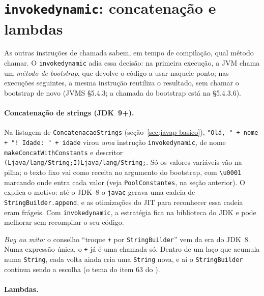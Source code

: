 \section{\texttt{invokedynamic}: concatenação e lambdas}
\label{sec:invokedynamic}

As outras instruções de chamada sabem, em tempo de compilação, qual
método chamar. O \texttt{invokedynamic} adia essa decisão: na primeira
execução, a JVM chama um \emph{método de bootstrap}, que devolve o código
a usar naquele ponto; nas execuções seguintes, a mesma instrução reutiliza
o resultado, sem chamar o bootstrap de novo (JVMS §5.4.3; a chamada do
bootstrap está na §5.4.3.6).

\paragraph{Concatenação de strings (JDK~9+).}
Na listagem de \texttt{ConcatenacaoStrings}
(seção~\ref{sec:javap-basico}), \texttt{"Olá, " + nome + "! Idade: " +
idade} virou \emph{uma} instrução \texttt{invokedynamic}, de nome
\texttt{makeConcatWithConstants} e descritor
\nolinkurl{(Ljava/lang/String;I)Ljava/lang/String;}. Só os
valores variáveis vão na pilha; o texto fixo vai como receita no
argumento do bootstrap, com \texttt{\textbackslash u0001} marcando onde
entra cada valor (veja \texttt{PoolConstantes}, na seção anterior). O
 explica o motivo: até o JDK~8 o \texttt{javac}
gerava uma cadeia de \texttt{StringBuilder.append}, e as otimizações do
JIT para reconhecer essa cadeia eram frágeis. Com \texttt{invokedynamic},
a estratégia fica na biblioteca do JDK e pode melhorar sem recompilar o
seu código.

\emph{Bug ou mito:} o conselho \enquote{troque \texttt{+} por
\texttt{StringBuilder}} vem da era do JDK~8. Numa expressão única, o
\texttt{+} já é uma chamada só. Dentro de um laço que acumula numa
\texttt{String}, cada volta ainda cria uma \texttt{String} nova, e aí o
\texttt{StringBuilder} continua sendo a escolha (o tema do item 63 do
).

\paragraph{Lambdas.}



